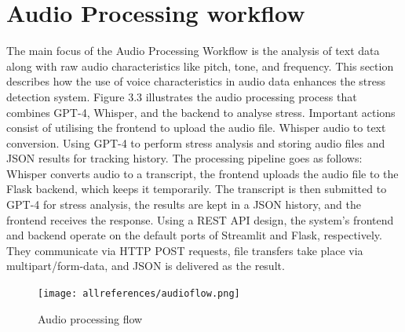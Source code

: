 \documentclass[Arial,12pt,openright,twoside]{book}
\begin{document}
\section{Audio Processing workflow} 
The main focus of the Audio Processing Workflow is the analysis of text data along with raw audio characteristics like pitch, tone, and frequency. This section describes how the use of voice characteristics in audio data enhances the stress detection system. Figure 3.3 illustrates the audio processing process that combines GPT-4, Whisper, and the backend to analyse stress. Important actions consist of utilising the frontend to upload the audio file. Whisper audio to text conversion. Using GPT-4 to perform stress analysis and storing audio files and JSON results for tracking history. The processing pipeline goes as follows: Whisper converts audio to a transcript, the frontend uploads the audio file to the Flask backend, which keeps it temporarily. The transcript is then submitted to GPT-4 for stress analysis, the results are kept in a JSON history, and the frontend receives the response. Using a REST API design, the system's frontend and backend operate on the default ports of Streamlit and Flask, respectively. They communicate via HTTP POST requests, file transfers take place via multipart/form-data, and JSON is delivered as the result. 
\vspace{10pt} %
\begin{figure}[H]
    \centering
    \texttt{[image: allreferences/audioflow.png]}
    \caption{Audio processing flow}
    \label{fig:system_architecture}
\end{figure}
\vspace{10pt} %
\end{document}
